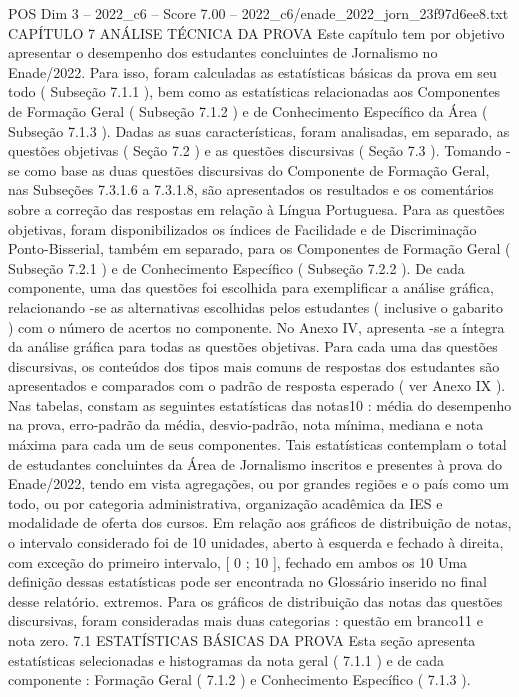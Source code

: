 \begin{textsample}{POS Dim 3 – 2022\_c6 – Score 7.00 – 2022\_c6/enade\_2022\_jorn\_23f97d6ee8.txt}  \label{ex:f3_pos_026}
CAPÍTULO 7 ANÁLISE TÉCNICA DA PROVA Este capítulo tem por objetivo apresentar o desempenho dos estudantes concluintes de Jornalismo no Enade/2022.
Para isso, foram calculadas as estatísticas básicas da prova em seu todo ( Subseção 7.1.1 ), bem como as estatísticas relacionadas aos Componentes de Formação Geral ( Subseção 7.1.2 ) e de Conhecimento Específico da Área ( Subseção 7.1.3 ).
Dadas as suas características, foram analisadas, em separado, as questões objetivas ( Seção 7.2 ) e as questões discursivas ( Seção 7.3 ).
Tomando -se como base as duas questões discursivas do Componente de Formação Geral, nas Subseções 7.3.1.6 a 7.3.1.8, são apresentados os resultados e os comentários sobre a correção das respostas em relação à Língua Portuguesa.
Para as questões objetivas, foram disponibilizados os índices de Facilidade e de Discriminação Ponto-Bisserial, também em separado, para os Componentes de Formação Geral ( Subseção 7.2.1 ) e de Conhecimento Específico ( Subseção 7.2.2 ).
De cada componente, uma das questões foi escolhida para exemplificar a análise gráfica, relacionando -se as alternativas escolhidas pelos estudantes ( inclusive o gabarito ) com o número de acertos no componente.
No Anexo IV, apresenta -se a íntegra da análise gráfica para todas as questões objetivas.
Para cada uma das questões discursivas, os conteúdos dos tipos mais comuns de respostas dos estudantes são apresentados e comparados com o padrão de resposta esperado ( ver Anexo IX ).
Nas tabelas, constam as seguintes estatísticas das notas10 : média do desempenho na prova, erro-padrão da média, desvio-padrão, nota mínima, mediana e nota máxima para cada um de seus componentes.
Tais estatísticas contemplam o total de estudantes concluintes da Área de Jornalismo inscritos e presentes à prova do Enade/2022, tendo em vista agregações, ou por grandes regiões e o país como um todo, ou por categoria administrativa, organização acadêmica da IES e modalidade de oferta dos cursos.
Em relação aos gráficos de distribuição de notas, o intervalo considerado foi de 10 unidades, aberto à esquerda e fechado à direita, com exceção do primeiro intervalo, [ 0 ; 10 ], fechado em ambos os 10 Uma definição dessas estatísticas pode ser encontrada no Glossário inserido no final desse relatório. extremos.
Para os gráficos de distribuição das notas das questões discursivas, foram consideradas mais duas categorias : questão em branco11 e nota zero. 7.1 ESTATÍSTICAS BÁSICAS DA PROVA Esta seção apresenta estatísticas selecionadas e histogramas da nota geral ( 7.1.1 ) e de cada componente : Formação Geral ( 7.1.2 ) e Conhecimento Específico ( 7.1.3 ).

\end{textsample}

